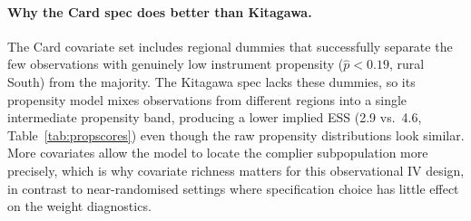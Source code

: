 \documentclass[12pt]{article}
\begin{document}
\paragraph{Why the Card spec does better than Kitagawa.}
The Card covariate set includes regional dummies that successfully
separate the few observations with genuinely low instrument propensity
($\hat{p} < 0.19$, rural South) from the majority.  The Kitagawa spec
lacks these dummies, so its propensity model mixes observations from
different regions into a single intermediate propensity band, producing
a lower implied ESS (2.9 vs.\ 4.6, Table~\ref{tab:propscores}) even
though the raw propensity distributions look similar.  More covariates
allow the model to locate the complier subpopulation more precisely,
which is why covariate richness matters for this observational IV
design, in contrast to near-randomised settings where specification
choice has little effect on the weight diagnostics.







\end{document}
